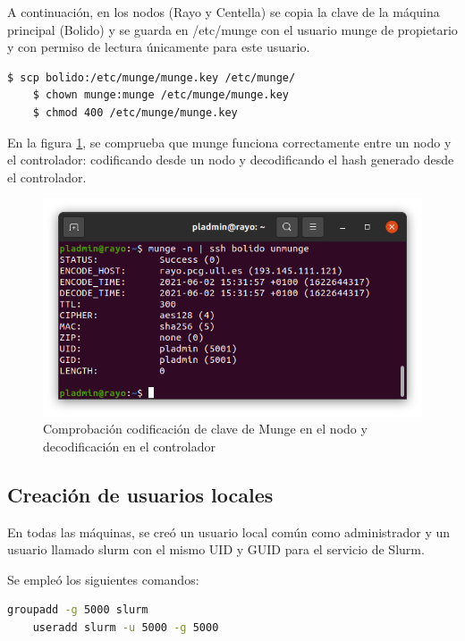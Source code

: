 A continuación, en los nodos (Rayo y Centella) se copia la clave de la máquina principal (Bolido) y se guarda en /etc/munge con el usuario munge de propietario y con permiso de lectura únicamente para este usuario.

\vspace{2mm}

\begin{lstlisting}[language=bash]
    $ scp bolido:/etc/munge/munge.key /etc/munge/
    $ chown munge:munge /etc/munge/munge.key
    $ chmod 400 /etc/munge/munge.key
\end{lstlisting}
\vspace{2mm}

En la figura \ref{munge:nodecheck}, se comprueba que munge funciona correctamente entre un nodo y el controlador: codificando desde un nodo y decodificando el hash generado desde el controlador.

\begin{figure}[htb]
   \centering
   \includegraphics[width=0.8\linewidth]{images/mungenode.png}
   \caption{Comprobación codificación de clave de Munge en el nodo y decodificación en el controlador}
   \label{munge:nodecheck}
\end{figure}

\subsection{Creación de usuarios locales}
\vspace{4mm}

En todas las máquinas, se creó un usuario local común como administrador y un usuario llamado slurm con el mismo UID y GUID para el servicio de Slurm. 
\vspace{4mm}

Se empleó los siguientes comandos: 

\begin{lstlisting}[language=bash]
    groupadd -g 5000 slurm
    useradd slurm -u 5000 -g 5000 
\end{lstlisting}

